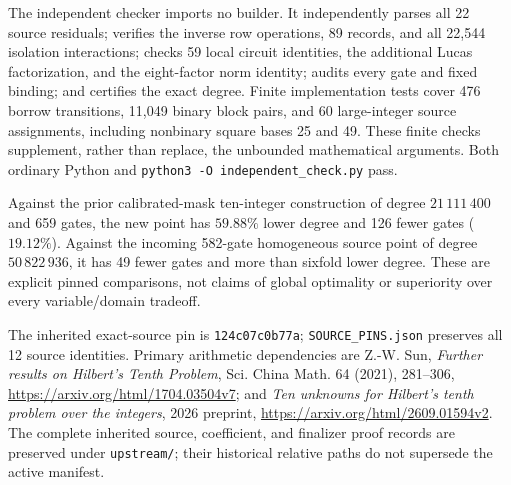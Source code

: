 The independent checker imports no builder. It independently parses all
22 source residuals; verifies the inverse row operations, 89 records,
and all 22,544 isolation interactions; checks 59 local circuit identities,
the additional Lucas factorization, and the eight-factor norm identity;
audits every gate and fixed binding; and certifies the exact degree.
Finite implementation tests cover 476 borrow transitions, 11,049 binary
block pairs, and 60 large-integer source assignments, including nonbinary
square bases 25 and 49. These finite checks supplement, rather than replace,
the unbounded mathematical arguments. Both ordinary Python and
\texttt{python3 -O independent\_check.py} pass.

Against the prior calibrated-mask ten-integer construction of degree
$21\,111\,400$ and 659 gates, the new point has $59.88\%$ lower degree and
126 fewer gates ($19.12\%$). Against the incoming 582-gate homogeneous
source point of degree $50\,822\,936$, it has 49 fewer gates and more than
sixfold lower degree. These are explicit pinned comparisons, not claims
of global optimality or superiority over every variable/domain tradeoff.

The inherited exact-source pin is
\texttt{124c07c0b77a};
\texttt{SOURCE\_PINS.json} preserves all 12 source identities.
Primary arithmetic dependencies are Z.-W. Sun,
\emph{Further results on Hilbert's Tenth Problem}, Sci. China Math. 64
(2021), 281--306, \url{https://arxiv.org/html/1704.03504v7}; and
\emph{Ten unknowns for Hilbert's tenth problem over the integers},
2026 preprint, \url{https://arxiv.org/html/2609.01594v2}.
The complete inherited source, coefficient, and finalizer proof records
are preserved under \texttt{upstream/}; their historical relative paths
do not supersede the active manifest.
